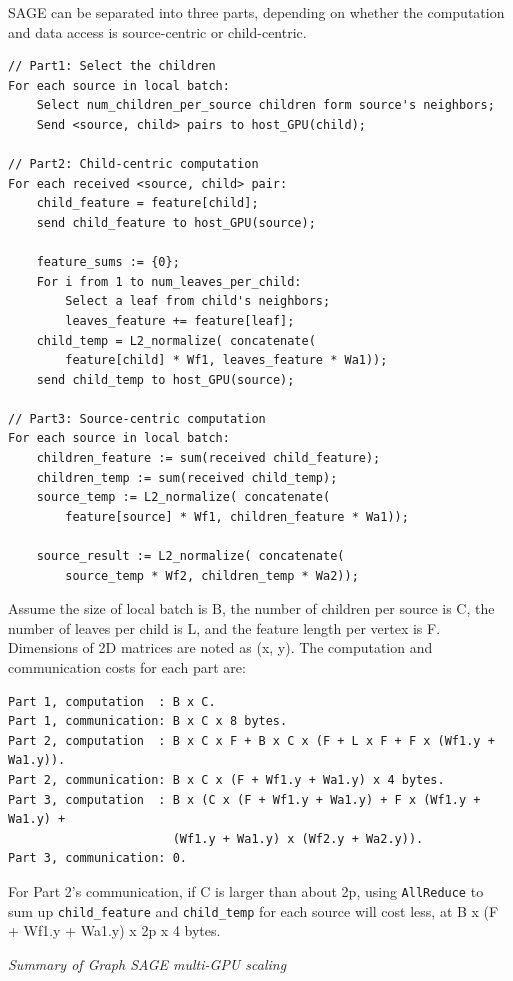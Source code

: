\documentclass[10pt,oneside]{memoir}
\begin{document}
SAGE can be separated into three parts, depending on whether the
computation and data access is source-centric or child-centric.

\begin{verbatim}
// Part1: Select the children
For each source in local batch:
    Select num_children_per_source children form source's neighbors;
    Send <source, child> pairs to host_GPU(child);

// Part2: Child-centric computation
For each received <source, child> pair:
    child_feature = feature[child];
    send child_feature to host_GPU(source);

    feature_sums := {0};
    For i from 1 to num_leaves_per_child:
        Select a leaf from child's neighbors;
        leaves_feature += feature[leaf];
    child_temp = L2_normalize( concatenate(
        feature[child] * Wf1, leaves_feature * Wa1));
    send child_temp to host_GPU(source);

// Part3: Source-centric computation
For each source in local batch:
    children_feature := sum(received child_feature);
    children_temp := sum(received child_temp);
    source_temp := L2_normalize( concatenate(
        feature[source] * Wf1, children_feature * Wa1));

    source_result := L2_normalize( concatenate(
        source_temp * Wf2, children_temp * Wa2));
\end{verbatim}

Assume the size of local batch is B, the number of children per source
is C, the number of leaves per child is L, and the feature length per
vertex is F. Dimensions of 2D matrices are noted as (x, y). The
computation and communication costs for each part are:

\begin{verbatim}
Part 1, computation  : B x C.
Part 1, communication: B x C x 8 bytes.
Part 2, computation  : B x C x F + B x C x (F + L x F + F x (Wf1.y + Wa1.y)).
Part 2, communication: B x C x (F + Wf1.y + Wa1.y) x 4 bytes.
Part 3, computation  : B x (C x (F + Wf1.y + Wa1.y) + F x (Wf1.y + Wa1.y) +
                       (Wf1.y + Wa1.y) x (Wf2.y + Wa2.y)).
Part 3, communication: 0.
\end{verbatim}

For Part 2's communication, if C is larger than about 2p, using
\texttt{AllReduce} to sum up \texttt{child\_feature} and
\texttt{child\_temp} for each source will cost less, at B x (F + Wf1.y +
Wa1.y) x 2p x 4 bytes.

\emph{Summary of Graph SAGE multi-GPU scaling}
\end{document}
